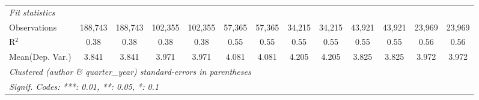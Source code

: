\begin{tabular}{lcccccccccccc}
   \midrule
   \emph{Fit statistics}\\
   Observations                             & 188,743       & 188,743       & 102,355       & 102,355      & 57,365       & 57,365       & 34,215       & 34,215        & 43,921       & 43,921  & 23,969  & 23,969\\  
   R$^2$                                    & 0.38          & 0.38          & 0.38          & 0.38         & 0.55         & 0.55         & 0.55         & 0.55          & 0.55         & 0.55    & 0.56    & 0.56\\  
Mean(Dep. Var.) & 3.841 & 3.841 & 3.971 & 3.971 & 4.081 & 4.081 & 4.205 & 4.205 & 3.825 & 3.825 & 3.972 & 3.972 \\
   \midrule \midrule
   \multicolumn{13}{l}{\emph{Clustered (author \& quarter\_year) standard-errors in parentheses}}\\
   \multicolumn{13}{l}{\emph{Signif. Codes: ***: 0.01, **: 0.05, *: 0.1}}\\
\end{tabular}
\par\endgroup

